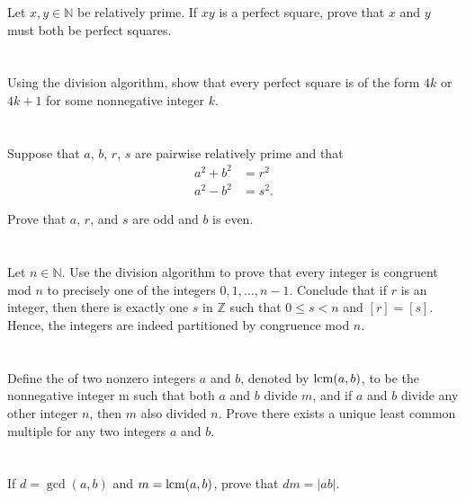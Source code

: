 Let $x, y \in \mathbb{N}$ be relatively prime. If $xy$ is a perfect square, prove that $x$ and $y$ must both be perfect squares.
\hr
\section{}\label{sec:2-20}

Using the division algorithm, show that every perfect square is of the form $4k$ or $4k+1$ for some nonnegative integer $k$.
\hr
\section{}\label{sec:2-21}

Suppose that $a$, $b$, $r$, $s$ are pairwise relatively prime and that
\begin{align*}
    a^2 + b^2 &= r^2 \\
    a^2 - b^2 &= s^2.
\end{align*}

Prove that $a$, $r$, and $s$ are odd and $b$ is even.
\hr
\section{}\label{sec:2-22}

Let $n \in \mathbb{N}$. Use the division algorithm to prove that every integer is congruent mod $n$ to precisely one of the integers $0, 1, \dots, n-1$. Conclude that if $r$ is an integer, then there is exactly one $s$ in $\mathbb{Z}$ such that $0 \leq s < n$ and $[r] = [s]$. Hence, the integers are indeed partitioned by congruence mod $n$.
\hr
\section{}\label{sec:2-23}

Define the  of two nonzero integers $a$ and $b$, denoted by $\operatorname{lcm}(a,b)$, to be the nonnegative integer m such that both $a$ and $b$ divide $m$, and if $a$ and $b$ divide any other integer $n$, then $m$ also divided $n$. Prove there exists a unique least common multiple for any two integers $a$ and $b$.
\hr
\section{}\label{sec:2-24}

If $d = \gcd(a,b)$ and $m = \operatorname{lcm}(a,b)$, prove that $dm = |ab|$.
\hr
\section{}\label{sec:2-25}

